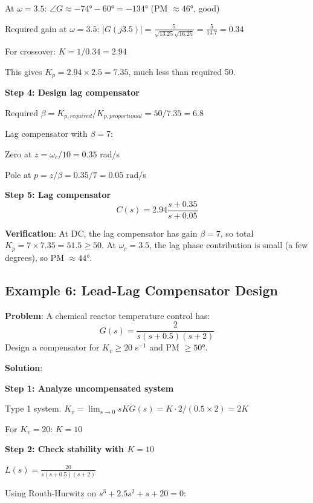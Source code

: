 At $\omega = 3.5$: $\angle G \approx -74° - 60° = -134°$ (PM $\approx 46°$, good)

Required gain at $\omega = 3.5$:
$|G(j3.5)| = \frac{5}{\sqrt{13.25}\sqrt{16.25}} = \frac{5}{14.7} = 0.34$

For crossover: $K = 1/0.34 = 2.94$

This gives $K_p = 2.94 \times 2.5 = 7.35$, much less than required 50.

\textbf{Step 4: Design lag compensator}

Required $\beta = K_{p,required}/K_{p,proportional} = 50/7.35 = 6.8$

Lag compensator with $\beta = 7$:

Zero at $z = \omega_c/10 = 0.35$ rad/s

Pole at $p = z/\beta = 0.35/7 = 0.05$ rad/s

\textbf{Step 5: Lag compensator}
\begin{equation}
C(s) = 2.94 \frac{s + 0.35}{s + 0.05}
\end{equation}

\textbf{Verification}: At DC, the lag compensator has gain $\beta = 7$, so total $K_p = 7 \times 7.35 = 51.5 \geq 50$. At $\omega_c = 3.5$, the lag phase contribution is small (a few degrees), so PM $\approx 44°$.

\subsection{Example 6: Lead-Lag Compensator Design}
\label{subsec:ex_lead_lag}

\textbf{Problem}: A chemical reactor temperature control has:
\begin{equation}
G(s) = \frac{2}{s(s + 0.5)(s + 2)}
\end{equation}
Design a compensator for $K_v \geq 20$ s$^{-1}$ and PM $\geq 50°$.

\textbf{Solution}:

\textbf{Step 1: Analyze uncompensated system}

Type 1 system. $K_v = \lim_{s \to 0} sKG(s) = K \cdot 2/(0.5 \times 2) = 2K$

For $K_v = 20$: $K = 10$

\textbf{Step 2: Check stability with $K = 10$}

$L(s) = \frac{20}{s(s+0.5)(s+2)}$

Using Routh-Hurwitz on $s^3 + 2.5s^2 + s + 20 = 0$:

